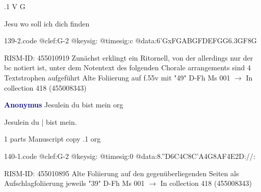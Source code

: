 \documentclass[twocolumn]{book}
\begin{document}
.1  V  G
\newline \begin{footnotesize} Jesu wo soll ich dich finden \end{footnotesize}  
\begin{filecontents*}{139-2.code}
@clef:G-2
@keysig:
@timesig:c
@data:{6'GxFGA}{BGFD}{EFGG}{6.3GF}8G
\end{filecontents*}
\newline
%

\newline RISM-ID: 455010919
\newline Zunächst erklingt ein Ritornell, von der allerdings nur der bc notiert ist, unter dem Notentext des folgenden Chorale arrangements sind 4 Textstrophen aufgeführt
\newline Alte Foliierung auf f.55v mit "49"
\newline D-Fh  Ms 001
\newline $\rightarrow$ In collection 418 (455008343)

\newline \par \vspace{7pt} \textcolor{darkblue}{\textbf{Anonymus  }}
\newline Jesulein du bist mein    
\newline org
\newline \begin{itshape}[f.39v, at left:] Jesulein du | bist mein.\end{itshape} 
\newline \textcolor{darkblue}{}  1 parts  
\newline Manuscript copy
.1  org  
\begin{filecontents*}{140-1.code}
@clef:G-2
@keysig:
@timesig:0
@data:8.''D6C4C{8C'A}4G{8AF}4E2D://:
\end{filecontents*}
\newline
%

\newline RISM-ID: 455010895
\newline Alte Foliierung auf den gegenüberliegenden Seiten als Aufschlagfoliierung jeweils "39"
\newline D-Fh  Ms 001
\newline $\rightarrow$ In collection 418 (455008343)
\end{document}
